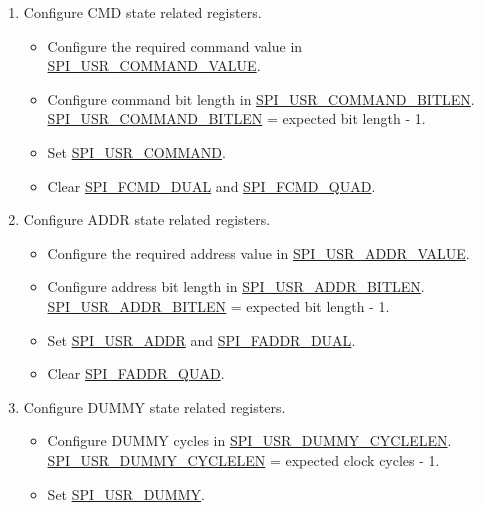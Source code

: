 \documentclass[main\_\_EN.tex]{subfiles}
\begin{document}
\begin{enumerate}
    \item Configure CMD state related registers.
        \begin{itemize}
            \item Configure the required command value in \hyperref[fielddesc:SPIUSRCOMMANDVALUE]{SPI\_USR\_COMMAND\_VALUE}.
            \item Configure command bit length in \hyperref[fielddesc:SPIUSRCOMMANDBITLEN]{SPI\_USR\_COMMAND\_BITLEN}. \hyperref[fielddesc:SPIUSRCOMMANDBITLEN]{SPI\_USR\_COMMAND\_BITLEN} = expected bit length - 1.
            \item Set \hyperref[fielddesc:SPIUSRCOMMAND]{SPI\_USR\_COMMAND}.
            \item Clear \hyperref[fielddesc:SPIFCMDDUAL]{SPI\_FCMD\_DUAL} and \hyperref[fielddesc:SPIFCMDQUAD]{SPI\_FCMD\_QUAD}.
        \end{itemize}
        
    \item Configure ADDR state related registers.
        \begin{itemize}
            \item Configure the required address value in \hyperref[fielddesc:SPIUSRADDRVALUE]{SPI\_USR\_ADDR\_VALUE}.
            \item Configure address bit length in \hyperref[fielddesc:SPIUSRADDRBITLEN]{SPI\_USR\_ADDR\_BITLEN}. \hyperref[fielddesc:SPIUSRADDRBITLEN]{SPI\_USR\_ADDR\_BITLEN} = expected bit length - 1.
            \item Set \hyperref[fielddesc:SPIUSRADDR]{SPI\_USR\_ADDR} and \hyperref[fielddesc:SPIFADDRDUAL]{SPI\_FADDR\_DUAL}.
            \item Clear \hyperref[fielddesc:SPIFADDRQUAD]{SPI\_FADDR\_QUAD}.
        \end{itemize}
        
    \item Configure DUMMY state related registers.
        \begin{itemize}
            \item Configure DUMMY cycles in \hyperref[fielddesc:SPIUSRDUMMYCYCLELEN]{SPI\_USR\_DUMMY\_CYCLELEN}. \hyperref[fielddesc:SPIUSRDUMMYCYCLELEN]{SPI\_USR\_DUMMY\_CYCLELEN} = expected clock cycles - 1.
            \item Set \hyperref[fielddesc:SPIUSRDUMMY]{SPI\_USR\_DUMMY}.
        \end{itemize}        
        

\end{enumerate}
\end{document}
